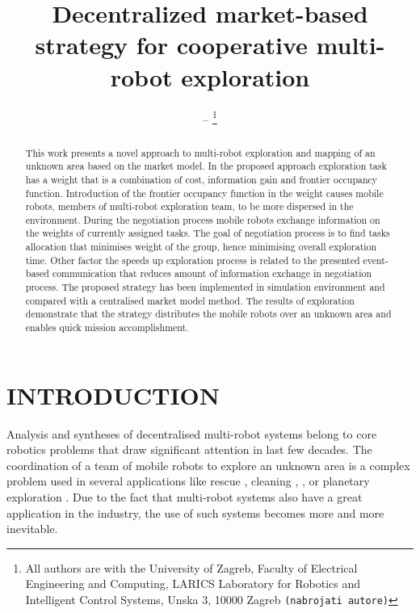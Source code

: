 \documentclass[letterpaper, 10 pt, conference]{ieeeconf}  %
\title{\LARGE \bf
Decentralized market-based strategy for cooperative multi-robot exploration 
}
\author{--%
\thanks{ All authors are with the University of Zagreb, Faculty of Electrical Engineering and Computing, LARICS Laboratory for Robotics and Intelligent Control Systems, Unska 3, 10000 Zagreb
 {\tt\small (nabrojati autore)}}%
}
\begin{document}
\maketitle
\thispagestyle{empty}
\pagestyle{empty}


\begin{abstract}

This work presents a novel approach to multi-robot exploration and mapping of an unknown area based on the market model. In the proposed approach exploration task has a weight that is a combination of cost, information gain and frontier occupancy function. Introduction of the frontier occupancy function in the weight causes mobile robots, members of multi-robot exploration team, to be more dispersed in the environment. During the negotiation process mobile robots exchange information on the weights of currently assigned tasks. The goal of negotiation process is to find tasks allocation that minimises weight of the group, hence minimising overall exploration time. Other factor the speeds up exploration process is related to the presented event-based communication that reduces amount of information exchange in negotiation process. The proposed strategy has been implemented in simulation environment and compared with a centralised market model method. The results of exploration demonstrate that the strategy distributes the mobile robots over an unknown area and enables quick mission accomplishment. 

\end{abstract}

 
\section{INTRODUCTION}
Analysis and syntheses of decentralised multi-robot systems belong to core robotics problems that draw significant attention in last few decades. The coordination of a team of mobile robots to explore an unknown area is a complex problem used in several applications like rescue \cite{rescue}, cleaning \cite{cleaning1}, \cite{cleaning2}, or planetary exploration \cite{planetary}. Due to the fact that multi-robot systems also have a great application in the industry, the use of such systems becomes more and more inevitable. 
\end{document}
